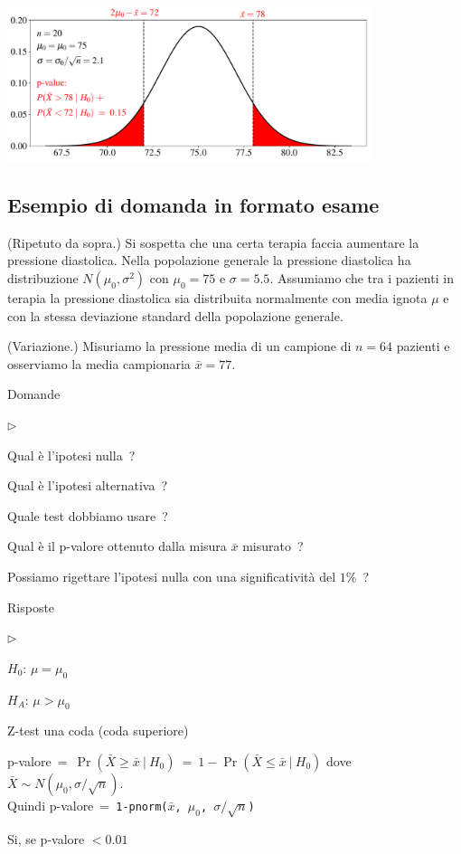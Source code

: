 \documentclass[12pt,openany]{book}
\newcommand{\mylabel}[1]{{\footnotesize\textsf{#1}}\hfill}
\renewenvironment{itemize}
  {\begin{list}{$\triangleright$}{%
   \setlength{\parskip}{0mm}
   \setlength{\topsep}{.2\baselineskip}
   \setlength{\rightmargin}{0mm}
   \setlength{\listparindent}{0mm}
   \setlength{\itemindent}{0mm}
   \setlength{\labelwidth}{3ex}
   \setlength{\itemsep}{.4\baselineskip}
   \setlength{\parsep}{0mm}
   \setlength{\partopsep}{0mm}
   \setlength{\labelsep}{1ex}
   \setlength{\leftmargin}{\labelwidth+\labelsep}
   \let\makelabel\mylabel}}{%
   \end{list}\vspace*{-1.3mm}}
\theoremstyle{mio}
\theoremstyle{liscio}
\begin{document}
\hfil\includegraphics[width=0.8\textwidth]{figure/Z-test-p-val_02.pdf}

\hfill{}\clearpage\subsection{Esempio di domanda in formato esame}

(Ripetuto da sopra.) Si sospetta che una certa terapia faccia aumentare la pressione diastolica. Nella popolazione generale la pressione diastolica ha distribuzione $N(\mu_0,\sigma^2)$ con $\mu_0=75$ e $\sigma=5.5$. Assumiamo che tra i pazienti in terapia la pressione diastolica sia distribuita normalmente con media ignota $\mu$ e con la stessa deviazione standard della popolazione generale.  

(Variazione.) Misuriamo la pressione media di un campione di $n=64$ pazienti e osserviamo la media campionaria $\bar x=77$.

Domande

\begin{itemize}
\item[1.] Qual è l'ipotesi nulla~?
\item[2.] Qual è l'ipotesi alternativa~?
\item[3.] Quale test dobbiamo usare~?
\item[3.] Qual è il p-valore ottenuto dalla misura $\bar x$ misurato~?
\item[4.] Possiamo rigettare l'ipotesi nulla con una significatività del $1\%$~? 
\end{itemize}

Risposte

\begin{itemize}
\item[1.] $H_0$: $\mu=\mu_0$
\item[2.] $H_A$: $\mu>\mu_0$
\item[3.] Z-test una coda (coda superiore)
\item[3.] p-valore\ =\ $\Pr(\bar X\ge \bar x\ |\ H_0)\ =\ 1-\Pr(\bar X\le \bar x\ |\ H_0)$ dove $\bar X\sim N(\mu_0,\sigma/\sqrt{n})$.\\ Quindi p-valore\ =\ {\tt 1-pnorm($\bar x$,\,$\mu_0$,\,$\sigma/\sqrt{n}$)}
\item[4.] Si, se p-valore $< 0.01$
\end{itemize}
\end{document}
